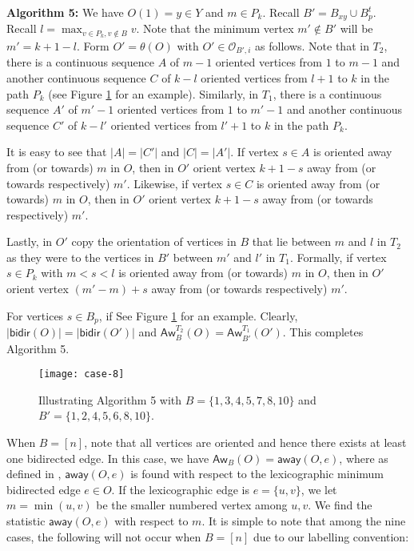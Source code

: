 \documentclass[12pt]{article}
\def\eod{\vrule height 6pt width 5pt depth 0pt}
\newenvironment{proof}{\noindent {\bf Proof:} \hspace{.2em}}
                      {\hspace*{\fill}{\eod}}
\newcommand{\sO}{  \mathcal{ O}}
\newcommand{\red}[1]{\textcolor{red}{#1}}
\newcommand{\aw}{\mathsf{away}}
\newcommand{\awy}{\mathsf{Aw}}
\newcommand{\bd}{\mathsf{bidir}}
\begin{document}
\begin{proof}
\bigskip
\textbf{Algorithm 5: } We have $O(1) = y \in Y$ and $m \in P_k$.
Recall $B' = B_{xy} \cup B_p^t$. 
Recall $l = \max_{v \in P_k, v \not \in B} v$.  Note that the minimum vertex 
$m' \not\in B'$ will be $m' = k+1-l$. 
Form $O' = \theta(O)$ with
$O' \in \sO_{B',i}$ as follows.  Note that in $T_2$, there is a 
continuous sequence $A$ of $m-1$ oriented vertices from $1$ to $m-1$ 
and another continuous sequence $C$ of $k-l$ oriented vertices from 
$l+1$ to $k$ in the path $P_k$ (see 
Figure \ref{fig:case8} for an example).  Similarly, in $T_1$, there is a 
continuous sequence $A'$ of $m'-1$ oriented vertices from $1$ to $m'-1$ 
and another continuous sequence $C'$ of $k-l'$ oriented vertices from 
$l'+1$ to $k$ in the path $P_k$.


It is easy to see that $|A| = |C'|$ and $|C| = |A'|$.
If vertex $s \in A$ is oriented away from (or towards) $m$ in $O$, then in
$O'$ orient vertex $k+1-s$ away from (or towards respectively) 
$m'$.  Likewise,
if vertex $s \in C$ is oriented away from (or towards) $m$ in $O$, then in
$O'$ orient vertex $k+1-s$ away from (or towards respectively) 
$m'$.  

Lastly, in $O'$ copy  the orientation of vertices 
in $B$ that lie between $m$ and $l$ in $T_2$ as they were to the 
vertices in $B'$ between $m'$ and $l'$ in $T_1$.  Formally,
if vertex $s \in P_k$ with $m < s < l$  is oriented
away from (or towards) $m$ in $O$, then in
$O'$ orient vertex $(m'-m)+s$ away from (or towards respectively) 
$m'$.   

For vertices $s \in B_p$, if 
See Figure \ref{fig:case8} for an example.  
Clearly, $|\bd(O)| = |\bd(O')|$ and 
$\awy_B^{T_2}(O) = \awy_{B'}^{T_1}(O')$.  This completes 
Algorithm 5.

\begin{figure}[h]
\centerline{\texttt{[image: case-8]}}
\caption{Illustrating Algorithm 5 with $B = \{1,3,4,5,7,8,10 \}$ and  $B' = \{1,2,4,5,6,8,10 \}$.  
}
\label{fig:case8}
\end{figure}



When $B = [n]$,  note that all vertices are oriented and hence 
there exists at least one bidirected edge.
In this case, %
we have $\awy_B^{}(O) = \aw(O,e)$, where as defined in 
\cite{mukesh-siva-hook}, $\aw(O,e)$ is found with respect to the lexicographic
minimum bidirected edge $e \in O$.  If the lexicographic edge is $e = \{u,v\}$,
we let $m = \min(u,v)$ be the smaller numbered vertex among $u,v$.  We find
the statistic $\aw(O,e)$
with respect to $m$.  It is simple to note that
among the nine cases, the following will not occur when $B = [n]$ due to
our labelling convention:  


\end{proof}
\end{document}
